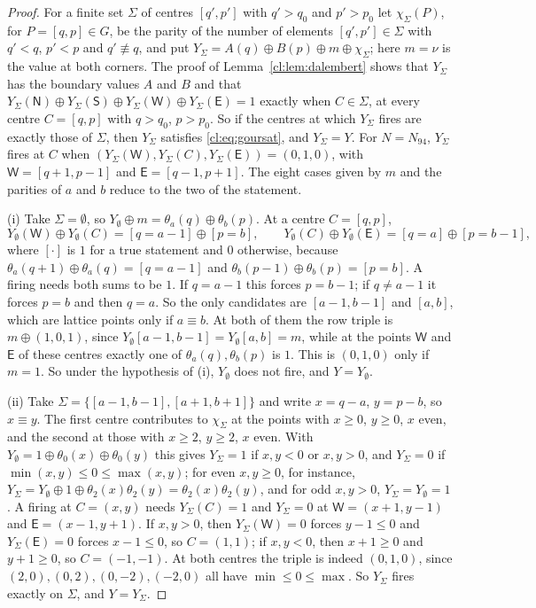 \begin{proof}
For a finite set $\Sigma$ of centres $[q',p']$ with $q'>q_0$ and $p'>p_0$ let $\chi_\Sigma(P)$, for $P=[q,p]\in G$, be the parity of the number of elements $[q',p']\in\Sigma$ with $q'<q$, $p'<p$ and $q'\not\equiv q$, and put $Y_\Sigma=A(q)\oplus B(p)\oplus m\oplus\chi_\Sigma$; here $m=\nu$ is the value at both corners. The proof of Lemma~\ref{cl:lem:dalembert} shows that $Y_\Sigma$ has the boundary values $A$ and $B$ and that $Y_\Sigma(\mathsf N)\oplus Y_\Sigma(\mathsf S)\oplus Y_\Sigma(\mathsf W)\oplus Y_\Sigma(\mathsf E)=1$ exactly when $C\in\Sigma$, at every centre $C=[q,p]$ with $q>q_0$, $p>p_0$. So if the centres at which $Y_\Sigma$ fires are exactly those of $\Sigma$, then $Y_\Sigma$ satisfies \eqref{cl:eq:goursat}, and $Y_\Sigma=Y$. For $N=N_{94}$, $Y_\Sigma$ fires at $C$ when $(Y_\Sigma(\mathsf W),Y_\Sigma(C),Y_\Sigma(\mathsf E))=(0,1,0)$, with $\mathsf W=[q+1,p-1]$ and $\mathsf E=[q-1,p+1]$. The eight cases given by $m$ and the parities of $a$ and $b$ reduce to the two of the statement.

(i) Take $\Sigma=\emptyset$, so $Y_\emptyset\oplus m=\theta_a(q)\oplus\theta_b(p)$. At a centre $C=[q,p]$,
\[
Y_\emptyset(\mathsf W)\oplus Y_\emptyset(C)=[q=a-1]\oplus[p=b],\qquad Y_\emptyset(C)\oplus Y_\emptyset(\mathsf E)=[q=a]\oplus[p=b-1],
\]
where $[\cdot]$ is $1$ for a true statement and $0$ otherwise, because $\theta_a(q+1)\oplus\theta_a(q)=[q=a-1]$ and $\theta_b(p-1)\oplus\theta_b(p)=[p=b]$. A firing needs both sums to be $1$. If $q=a-1$ this forces $p=b-1$; if $q\ne a-1$ it forces $p=b$ and then $q=a$. So the only candidates are $[a-1,b-1]$ and $[a,b]$, which are lattice points only if $a\equiv b$. At both of them the row triple is $m\oplus(1,0,1)$, since $Y_\emptyset[a-1,b-1]=Y_\emptyset[a,b]=m$, while at the points $\mathsf W$ and $\mathsf E$ of these centres exactly one of $\theta_a(q),\theta_b(p)$ is $1$. This is $(0,1,0)$ only if $m=1$. So under the hypothesis of (i), $Y_\emptyset$ does not fire, and $Y=Y_\emptyset$.

(ii) Take $\Sigma=\{[a-1,b-1],[a+1,b+1]\}$ and write $x=q-a$, $y=p-b$, so $x\equiv y$. The first centre contributes to $\chi_\Sigma$ at the points with $x\ge0$, $y\ge0$, $x$ even, and the second at those with $x\ge2$, $y\ge2$, $x$ even. With $Y_\emptyset=1\oplus\theta_0(x)\oplus\theta_0(y)$ this gives $Y_\Sigma=1$ if $x,y<0$ or $x,y>0$, and $Y_\Sigma=0$ if $\min(x,y)\le0\le\max(x,y)$; for even $x,y\ge0$, for instance, $Y_\Sigma=Y_\emptyset\oplus1\oplus\theta_2(x)\theta_2(y)=\theta_2(x)\theta_2(y)$, and for odd $x,y>0$, $Y_\Sigma=Y_\emptyset=1$. A firing at $C=(x,y)$ needs $Y_\Sigma(C)=1$ and $Y_\Sigma=0$ at $\mathsf W=(x+1,y-1)$ and $\mathsf E=(x-1,y+1)$. If $x,y>0$, then $Y_\Sigma(\mathsf W)=0$ forces $y-1\le0$ and $Y_\Sigma(\mathsf E)=0$ forces $x-1\le0$, so $C=(1,1)$; if $x,y<0$, then $x+1\ge0$ and $y+1\ge0$, so $C=(-1,-1)$. At both centres the triple is indeed $(0,1,0)$, since $(2,0),(0,2),(0,-2),(-2,0)$ all have $\min\le0\le\max$. So $Y_\Sigma$ fires exactly on $\Sigma$, and $Y=Y_\Sigma$.
\end{proof}


